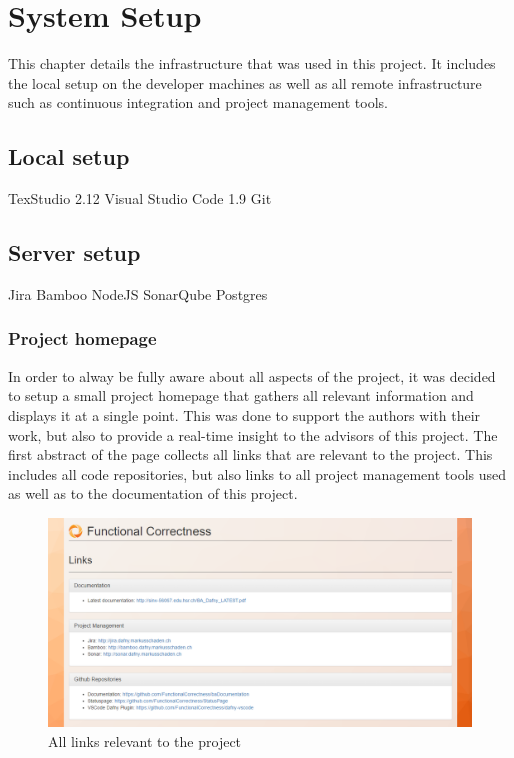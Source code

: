 \section{System Setup}
This chapter details the infrastructure that was used in this project. It includes the local setup on the developer machines as well as all remote infrastructure such as continuous integration and project management tools. 
\subsection{Local setup}
TexStudio 2.12\newline
Visual Studio Code 1.9\newline
Git 


\subsection{Server setup}
Jira \newline
Bamboo\newline
NodeJS\newline
SonarQube\newline
Postgres

\subsubsection{Project homepage}
In order to alway be fully aware about all aspects of the project, it was decided to setup a small project homepage that gathers all relevant information and displays it at a single point. This was done to support the authors with their work, but also to provide a real-time insight to the advisors of this project. \newline
The first abstract of the page collects all links that are relevant to the project. This includes all code repositories, but also links to all project management tools used as well as to the documentation of this project.  \newline
\begin{figure}[H]
	\centering
	\includegraphics[width=1\textwidth]{img/homeLinks}
	\caption{All links relevant to the project}
	\label{fig:Project Links}
\end{figure}

